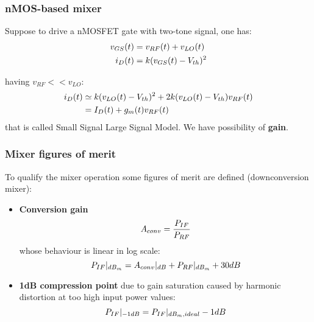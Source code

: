 \begin{frame}
	\frametitle{nMOS-based mixer}
	Suppose to drive a nMOSFET gate with two-tone signal, one has:
	\begin{align}
	v_{GS}(t) &=v_{RF}(t)+v_{LO}(t) \notag \\
	i_D(t) &= k(v_{GS}(t)-V_{th})^2 \notag 
	\end{align}
		
	having $v_{RF}<<v_{LO}$:
	\begin{align}
	i_D(t) &\simeq k(v_{LO}(t)-V_{th})^2+2k(v_{LO}(t)-V_{th})v_{RF}(t) \notag  \\
	& = I_D(t)+g_m(t)v_{RF}(t) \notag
	\end{align}
	that is called Small Signal Large Signal Model. We have possibility of \textbf{gain}.

\end{frame}

\begin{frame}
	\frametitle{Mixer figures of merit}
	To qualify the mixer operation some figures of merit are defined (downconversion mixer):
	\begin{itemize}
		\item \textbf{Conversion gain}
		\begin{equation}
			A_{conv}=\frac{P_{IF}}{P_{RF}} \notag 
		\end{equation}
		whose behaviour is linear in log scale:
		\begin{equation}
			P_{IF}|_{dB_{m}} = A_{conv}|_{dB} + P_{RF}|_{dB_{m}}+30dB \notag
		\end{equation}
		\item \textbf{1dB compression point} due to gain saturation caused by harmonic distortion at too high input power values:
		\begin{equation}
			P_{IF}|_{-1dB} = P_{IF}|_{dB_{m},ideal} -1dB \notag
		\end{equation} 
	\end{itemize}
\end{frame}

